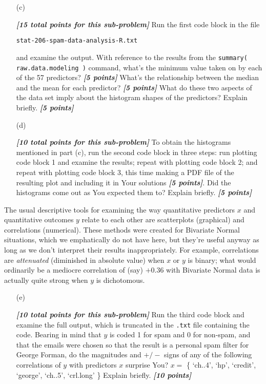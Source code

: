 \documentclass[12pt]{article}
\newcommand{\bi}[1]{\textbf{\textit{#1}}}
\begin{document}
\begin{itemize}

\item[(c)]

\bi{[15 total points for this sub-problem]} Run the first code block in the file 

\hspace*{0.5in} \texttt{stat-206-spam-data-analysis-R.txt} 

and examine the output. With reference to the results from the \texttt{summary( raw.data.modeling )} command, what's the minimum value taken on by each of the 57 predictors? \bi{[5 points]} What's the relationship between the median and the mean for each predictor? \bi{[5 points]} What do these two aspects of the data set imply about the histogram shapes of the predictors? Explain briefly. \bi{[5 points]}

\item[(d)]

\bi{[10 total points for this sub-problem]} To obtain the histograms mentioned in part (c), run the second code block in three steps: run plotting code block 1 and examine the results; repeat with plotting code block 2; and repeat with plotting code block 3, this time making a PDF file of the resulting plot and including it in Your solutions \bi{[5 points]}. Did the histograms come out as You expected them to? Explain briefly. \bi{[5 points]}

\end{itemize}

The usual descriptive tools for examining the way quantitative predictors $x$ and quantitative outcomes $y$ relate to each other are scatterplots (graphical) and correlations (numerical). These methods were created for Bivariate Normal situations, which we emphatically do not have here, but they're useful anyway as long as we don't interpret their results inappropriately. For example, correlations are \textit{attenuated} (diminished in absolute value) when $x$ or $y$ is binary; what would ordinarily be a mediocre correlation of (say) $+0.36$ with Bivariate Normal data is actually quite strong when $y$ is dichotomous.

\begin{itemize}

\item[(e)]

\bi{[10 total points for this sub-problem]} Run the third code block and examine the full output, which is truncated in the \texttt{.txt} file containing the code. Bearing in mind that $y$ is coded 1 for spam and 0 for non-spam, and that the emails were chosen so that the result is a personal spam filter for George Forman, do the magnitudes and $+/-$ signs of any of the following correlations of $y$ with predictors $x$ surprise You? $x =$ \{ `ch..4', `hp', `credit', `george', `ch..5', `crl.long' \} Explain briefly. \bi{[10 points]}

\end{itemize}
\end{document}
